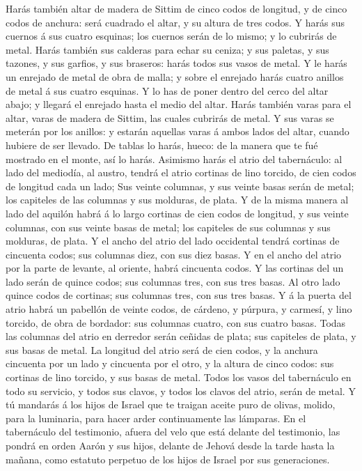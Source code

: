  Harás también altar de madera de Sittim de cinco codos de
longitud, y de cinco codos de anchura: será cuadrado el altar, y su
altura de tres codos.  Y harás sus cuernos á sus cuatro
esquinas; los cuernos serán de lo mismo; y lo cubrirás de metal.
 Harás también sus calderas para echar su ceniza; y sus
paletas, y sus tazones, y sus garfios, y sus braseros: harás todos sus
vasos de metal.  Y le harás un enrejado de metal de obra
de malla; y sobre el enrejado harás cuatro anillos de metal á sus cuatro
esquinas.  Y lo has de poner dentro del cerco del altar
abajo; y llegará el enrejado hasta el medio del altar. 
Harás también varas para el altar, varas de madera de Sittim, las cuales
cubrirás de metal.  Y sus varas se meterán por los
anillos: y estarán aquellas varas á ambos lados del altar, cuando
hubiere de ser llevado.  De tablas lo harás, hueco: de la
manera que te fué mostrado en el monte, así lo harás. 
Asimismo harás el atrio del tabernáculo: al lado del mediodía, al
austro, tendrá el atrio cortinas de lino torcido, de cien codos de
longitud cada un lado;  Sus veinte columnas, y sus veinte
basas serán de metal; los capiteles de las columnas y sus molduras, de
plata.  Y de la misma manera al lado del aquilón habrá á
lo largo cortinas de cien codos de longitud, y sus veinte columnas, con
sus veinte basas de metal; los capiteles de sus columnas y sus molduras,
de plata.  Y el ancho del atrio del lado occidental
tendrá cortinas de cincuenta codos; sus columnas diez, con sus diez
basas.  Y en el ancho del atrio por la parte de levante,
al oriente, habrá cincuenta codos.  Y las cortinas del un
lado serán de quince codos; sus columnas tres, con sus tres basas.
 Al otro lado quince codos de cortinas; sus columnas
tres, con sus tres basas.  Y á la puerta del atrio habrá
un pabellón de veinte codos, de cárdeno, y púrpura, y carmesí, y lino
torcido, de obra de bordador: sus columnas cuatro, con sus cuatro basas.
 Todas las columnas del atrio en derredor serán ceñidas
de plata; sus capiteles de plata, y sus basas de metal. 
La longitud del atrio será de cien codos, y la anchura cincuenta por un
lado y cincuenta por el otro, y la altura de cinco codos: sus cortinas
de lino torcido, y sus basas de metal.  Todos los vasos
del tabernáculo en todo su servicio, y todos sus clavos, y todos los
clavos del atrio, serán de metal.  Y tú mandarás á los
hijos de Israel que te traigan aceite puro de olivas, molido, para la
luminaria, para hacer arder continuamente las lámparas. 
En el tabernáculo del testimonio, afuera del velo que está delante del
testimonio, las pondrá en orden Aarón y sus hijos, delante de Jehová
desde la tarde hasta la mañana, como estatuto perpetuo de los hijos de
Israel por sus generaciones.

